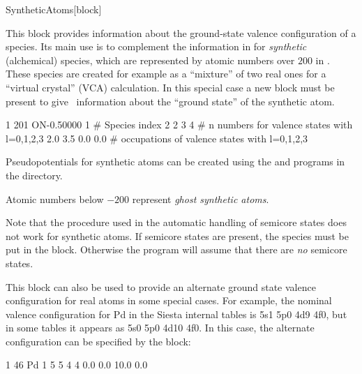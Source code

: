   \begin{fdfentry}{SyntheticAtoms}[block]
  
    This block provides information about the ground-state valence configuration of
    a species. Its main use is to complement the information in
     for \emph{synthetic} (alchemical)
     species, which are represented by atomic numbers over $200$ in
     . These species are created for example as a ``mixture'' of two
    real ones for a ``virtual crystal'' (VCA)
    calculation. In this special case a new  block
    must be present to give \siesta\ information about the ``ground
    state'' of the synthetic atom.
  
    \begin{fdfexample}
          1   201 ON-0.50000
          1               # Species index
          2 2 3 4         # n numbers for valence states  with l=0,1,2,3
          2.0 3.5 0.0 0.0 # occupations of valence states with l=0,1,2,3
    \end{fdfexample}
  
    Pseudopotentials for synthetic atoms can be created using the
     and  programs  in the 
    directory.
  
    Atomic numbers below $-200$ represent \emph{ghost synthetic atoms}.
  
    Note that the procedure used in the automatic handling of semicore
    states does not work for synthetic atoms.  If semicore states are
    present, the species must be put in the  block.
    Otherwise the program will assume that there are \emph{no} semicore
    states.
  
    This block can also be used to provide an alternate ground state
    valence configuration for real atoms in some special cases.
    For example, the nominal valence configuration for Pd in the Siesta
    internal tables is 5s1 5p0 4d9 4f0, but in some tables it appears as
    5s0 5p0 4d10 4f0. In this case, the alternate configuration can be
    specified by the block:
  
    \begin{fdfexample}
          1   46 Pd
       1
         5 5 4 4
         0.0 0.0 10.0 0.0
    \end{fdfexample}
  

\end{fdfentry}
